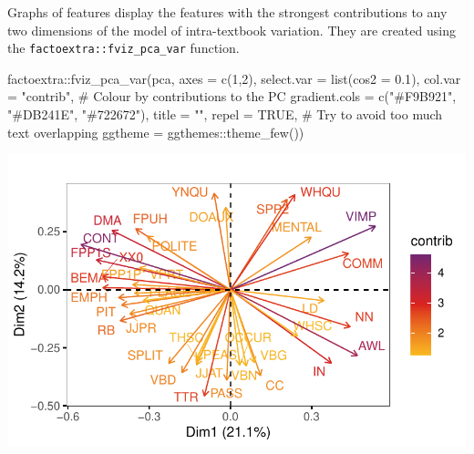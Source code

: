\documentclass[
  letterpaper,
  DIV=11,
  numbers=noendperiod]{scrreprt}
\newenvironment{Shaded}{\begin{snugshade}}{\end{snugshade}}
\newcommand{\AttributeTok}[1]{\textcolor[rgb]{0.40,0.45,0.13}{#1}}
\newcommand{\CommentTok}[1]{\textcolor[rgb]{0.37,0.37,0.37}{#1}}
\newcommand{\ConstantTok}[1]{\textcolor[rgb]{0.56,0.35,0.01}{#1}}
\newcommand{\DecValTok}[1]{\textcolor[rgb]{0.68,0.00,0.00}{#1}}
\newcommand{\FloatTok}[1]{\textcolor[rgb]{0.68,0.00,0.00}{#1}}
\newcommand{\FunctionTok}[1]{\textcolor[rgb]{0.28,0.35,0.67}{#1}}
\newcommand{\NormalTok}[1]{\textcolor[rgb]{0.00,0.23,0.31}{#1}}
\newcommand{\SpecialCharTok}[1]{\textcolor[rgb]{0.37,0.37,0.37}{#1}}
\newcommand{\StringTok}[1]{\textcolor[rgb]{0.13,0.47,0.30}{#1}}
\begin{document}
Graphs of features display the features with the strongest contributions
to any two dimensions of the model of intra-textbook variation. They are
created using the \texttt{factoextra::fviz\_pca\_var} function.

\begin{Shaded}
\begin{Highlighting}[]
\NormalTok{factoextra}\SpecialCharTok{::}\FunctionTok{fviz\_pca\_var}\NormalTok{(pca,}
             \AttributeTok{axes =} \FunctionTok{c}\NormalTok{(}\DecValTok{1}\NormalTok{,}\DecValTok{2}\NormalTok{),}
             \AttributeTok{select.var =} \FunctionTok{list}\NormalTok{(}\AttributeTok{cos2 =} \FloatTok{0.1}\NormalTok{),}
             \AttributeTok{col.var =} \StringTok{"contrib"}\NormalTok{, }\CommentTok{\# Colour by contributions to the PC}
             \AttributeTok{gradient.cols =} \FunctionTok{c}\NormalTok{(}\StringTok{"\#F9B921"}\NormalTok{, }\StringTok{"\#DB241E"}\NormalTok{, }\StringTok{"\#722672"}\NormalTok{),}
             \AttributeTok{title =} \StringTok{""}\NormalTok{,}
             \AttributeTok{repel =} \ConstantTok{TRUE}\NormalTok{, }\CommentTok{\# Try to avoid too much text overlapping}
             \AttributeTok{ggtheme =}\NormalTok{ ggthemes}\SpecialCharTok{::}\FunctionTok{theme\_few}\NormalTok{())}
\end{Highlighting}
\end{Shaded}

\includegraphics{AppendixF_files/figure-pdf/graphs-of-variables-1.pdf}
\end{document}
